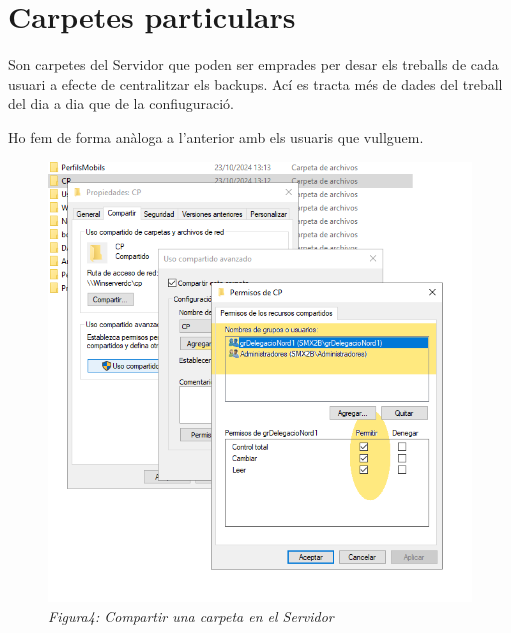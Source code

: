\documentclass[
  a4paper,
]{article}
\begin{document}
\section{Carpetes particulars}\label{carpetes-particulars}

Son carpetes del Servidor que poden ser emprades per desar els treballs
de cada usuari a efecte de centralitzar els backups. Ací es tracta més
de dades del treball del dia a dia que de la confiuguració.

Ho fem de forma anàloga a l'anterior amb els usuaris que vullguem.

\begin{figure}
\centering
\includegraphics{png/CarpetaCarpetasParticulares.png}
\caption{\emph{Figura4: Compartir una carpeta en el Servidor}}
\end{figure}
\end{document}
